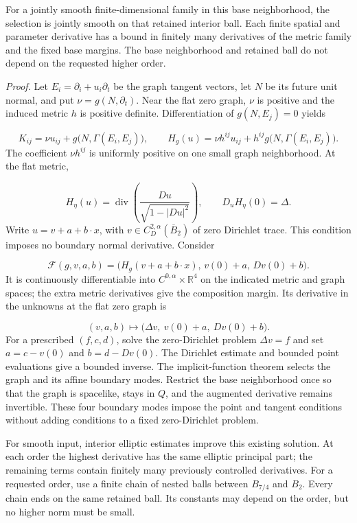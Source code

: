 \documentclass[
  english,
  11pt,
  reqno]{amsart}
\begin{document}
For a jointly smooth finite-dimensional family in this base
neighborhood, the selection is jointly smooth on that retained interior
ball. Each finite spatial and parameter derivative has a bound in
finitely many derivatives of the metric family and the fixed base
margins. The base neighborhood and retained ball do not depend on the
requested higher order.

\emph{Proof.} Let \(E_i=\partial_i+u_i\partial_t\) be the graph tangent
vectors, let \(N\) be its future unit normal, and put
\(\nu=g(N,\partial_t)\). Near the flat zero graph, \(\nu\) is positive
and the induced metric \(h\) is positive definite. Differentiation of
\(g(N,E_j)=0\) yields

\label{eq:submission-maximal-graph-equation} \[
K_{ij}
=
\nu u_{ij}+g\bigl(N,\Gamma(E_i,E_j)\bigr),
\qquad
H_g(u)
=
\nu h^{ij}u_{ij}
+h^{ij}g\bigl(N,\Gamma(E_i,E_j)\bigr).
\] The coefficient \(\nu h^{ij}\) is uniformly positive on one small
graph neighborhood. At the flat metric,

\label{eq:submission-maximal-graph-linearization} \[
H_\eta(u)
=
\operatorname{div}\left(
\frac{Du}{\sqrt{1-|Du|^2}}
\right),
\qquad
D_uH_\eta(0)=\Delta.
\] Write \(u=v+a+b\cdot x\), with \(v\in C_D^{2,\alpha}(\overline B_2)\)
of zero Dirichlet trace. This condition imposes no boundary normal
derivative. Consider

\label{eq:submission-augmented-graph-map} \[
\mathcal F(g,v,a,b)
=
\bigl(
H_g(v+a+b\cdot x),\,
v(0)+a,\,
Dv(0)+b
\bigr).
\] It is continuously differentiable into
\(C^{0,\alpha}\times\mathbb R^4\) on the indicated metric and graph
spaces; the extra metric derivatives give the composition margin. Its
derivative in the unknowns at the flat zero graph is

\label{eq:submission-augmented-graph-derivative} \[
(v,a,b)
\longmapsto
\bigl(\Delta v,\ v(0)+a,\ Dv(0)+b\bigr).
\] For a prescribed \((f,c,d)\), solve the zero-Dirichlet problem
\(\Delta v=f\) and set \(a=c-v(0)\) and \(b=d-Dv(0)\). The Dirichlet
estimate and bounded point evaluations give a bounded inverse. The
implicit-function theorem selects the graph and its affine boundary
modes. Restrict the base neighborhood once so that the graph is
spacelike, stays in \(Q\), and the augmented derivative remains
invertible. These four boundary modes impose the point and tangent
conditions without adding conditions to a fixed zero-Dirichlet problem.

For smooth input, interior elliptic estimates improve this existing
solution. At each order the highest derivative has the same elliptic
principal part; the remaining terms contain finitely many previously
controlled derivatives. For a requested order, use a finite chain of
nested balls between \(B_{7/4}\) and \(B_2\). Every chain ends on the
same retained ball. Its constants may depend on the order, but no higher
norm must be small.
\end{document}
